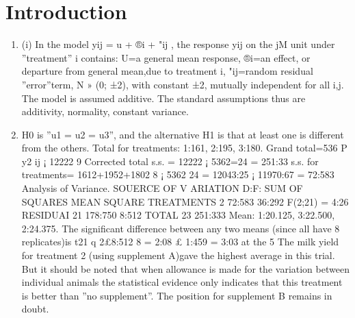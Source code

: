 \documentclass[a4paper,12pt]{article}
\begin{document}
\maketitle

\section{Introduction}
\begin{enumerate}
    \item (i) In the model yij = u + ®i + "ij , the response yij on the jM unit under ”treatment” i
contains:
U=a general mean response,
®i=an effect, or departure from general mean,due to treatment i,
"ij=random residual ”error”term, N » (0; ±2), with constant ±2, mutually independent
for all i,j.
The model is assumed additive. The standard assumptions thus are additivity, normality,
constant variance.
\item H0 is ”u1 = u2 = u3”, and the alternative H1 is that at least one is different from the
others.
Total for treatments: 1:161, 2:195, 3:180. Grand total=536
P
y2
ij ¡ 12222
9
Corrected total s.s. = 12222 ¡ 5362=24 = 251:33 s.s. for treatments= 1612+1952+1802
8 ¡
5362
24 = 12043:25 ¡ 11970:67 = 72:583
Analysis of Variance.
SOUERCE OF V ARIATION D:F: SUM OF SQUARES MEAN SQUARE
TREATMENTS 2 72:583 36:292 F(2;21) = 4:26
RESIDUAI 21 178:750 8:512
TOTAL 23 251:333
Mean: 1:20.125, 3:22.500, 2:24.375. The significant difference between any two means
(since all have 8 replicates)is t21
q
2£8:512
8 = 2:08 £ 1:459 = 3:03 at the 5%
The milk yield for treatment 2 (using supplement A)gave the highest average in this
trial. But it should be noted that when allowance is made for the variation between
individual animals the statistical evidence only indicates that this treatment is better
than ”no supplement”. The position for supplement B remains in doubt.
\end{enumerate}
\end{document}
